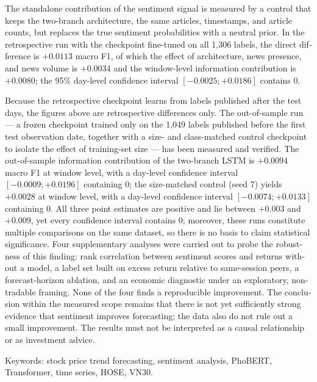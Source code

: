 \begin{otherlanguage}{english}
The standalone contribution of the sentiment signal is measured by a control that
keeps the two-branch architecture, the same articles, timestamps, and article
counts, but replaces the true sentiment probabilities with a neutral prior. In
the retrospective run with the checkpoint fine-tuned on all 1,306 labels, the
direct difference is $+0.0113$ macro F1, of which the effect of architecture,
news presence, and news volume is $+0.0034$ and the window-level information
contribution is $+0.0080$; the 95\% day-level confidence interval $[-0.0025;
+0.0186]$ contains 0.

Because the retrospective checkpoint learns from labels published after the test
days, the figures above are retrospective differences only. The out-of-sample run
--- a frozen checkpoint trained only on the 1,049 labels published before the
first test observation date, together with a size- and class-matched control
checkpoint to isolate the effect of training-set size --- has been measured and
verified. The out-of-sample information contribution of the two-branch LSTM is
$+0.0094$ macro F1 at window level, with a day-level confidence interval
$[-0.0009; +0.0196]$ containing 0; the size-matched control (seed 7) yields
$+0.0028$ at window level, with a day-level confidence interval $[-0.0074;
+0.0133]$ containing 0. All three point estimates are positive and lie between
$+0.003$ and $+0.009$, yet every confidence interval contains 0; moreover, these
runs constitute multiple comparisons on the same dataset, so there is no basis to
claim statistical significance. Four supplementary analyses were carried out to
probe the robustness of this finding: rank correlation between sentiment scores
and returns without a model, a label set built on excess return relative to
same-session peers, a forecast-horizon ablation, and an economic diagnostic under
an exploratory, non-tradable framing. None of the four finds a reproducible
improvement. The conclusion within the measured scope remains that there is not
yet sufficiently strong evidence that sentiment improves forecasting; the data
also do not rule out a small improvement. The results must not be interpreted as
a causal relationship or as investment advice.

\vspace{0.5cm}
\noindent Keywords: stock price trend forecasting, sentiment analysis, PhoBERT,
Transformer, time series, HOSE, VN30.
\end{otherlanguage}
